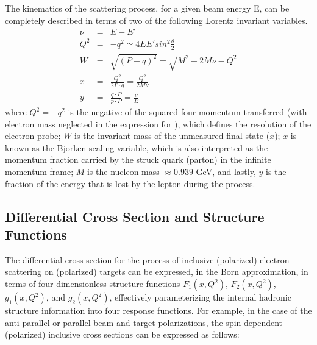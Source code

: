 The kinematics of the scattering process, for a given beam energy E, can be completely described in terms of %
two of the following Lorentz invariant variables. %
\begin{eqnarray}
\label{nuQ2W}
\nu &=& E - E'    \\
Q^2 &=& -q^2  \simeq  4 E E' sin^2 \frac{\theta}{2}   \\
W   &=& \sqrt{(P+q)^2} = \sqrt{M^2 + 2M \nu  - Q^2}          \\
x   &=& \frac{Q^2}{2P\cdot q} = \frac{Q^2}{2M\nu}     \\
y   &=& \frac{q \cdot P}{p \cdot P} = \frac{\nu}{E}
\end{eqnarray}
where $Q^2 = - q^2$ is the negative of the squared four-momentum transferred (with electron mass neglected %
in the expression for \qsq), which defines the resolution %
of the electron probe;  $W$ is the invariant mass of the unmeasured final state ($x$);  $x$ is known as the Bjorken scaling variable, which is also interpreted as the momentum fraction carried by the struck quark (parton) in the infinite momentum frame;  $M$ is the nucleon mass $\approx 0.939$ GeV, and lastly, $y$ is the fraction of the energy that is lost by the lepton during the process. 
 



\subsection{Differential Cross Section and Structure Functions}

The differential cross section for the process of inclusive (polarized) electron %
scattering on (polarized) targets can be expressed, in the Born approximation, in terms of four dimensionless structure functions $F_1(x,Q^2)$, $F_2(x,Q^2)$, $g_1(x,Q^2)$, and $g_2(x,Q^2)$, effectively parameterizing the internal hadronic structure information into four response functions. %
For example, in the case of the anti-parallel or parallel beam and target polarizations, the spin-dependent (polarized) inclusive cross sections can be expressed as follows:

